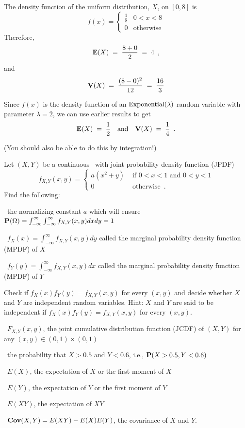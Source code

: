 \begin{ExerciseList}
\item The density function of the uniform distribution, $X$,  on $[0,8]$ is  $$f(x)=\begin{cases}\frac{1}{8}&0<x<8\\0&\textrm{otherwise}\end{cases}$$
Therefore, $$\mathbf{E}(X)\;=\;\frac{8+0}{2}\;=\;4\enspace,$$
and $$\mathbf{V}(X)\;=\;\frac{(8-0)^2}{12}\;=\;\frac{16}{3}$$

\item Since $f(x)$ is the density function of an $\mbox{{\rm Exponential}}(\lambda)$ random variable with parameter $\lambda=2$, we can use earlier results to get
$$\mathbf{E}(X)\;=\;\frac{1}{2}\quad \text{and}\quad
\mathbf{V}(X)\;=\;\frac{1}{4}\enspace.$$

(You should also be able to do this by integration!)
\ee

\Exercise
Let $(X,Y)$ be a continuous \rv~with joint probability density function (JPDF)
\[
f_{X,Y}(x,y)
=
\begin{cases}
a (x^2+y) & \text{ if } 0 < x < 1 \text{ and } 0 < y < 1\\
0 & \text{ otherwise} \enspace .
\end{cases}
\]
Find the following:
\be
\item~the normalizing constant $a$ which will ensure $\mathbf{P}(\Omega) = \int_{-\infty}^{\infty}\int_{-\infty}^{\infty} f_{X,Y}(x,y) dx dy = 1$
\item~$f_X(x) = \int_{-\infty}^{\infty} f_{X,Y}(x,y) dy$ called the marginal probability density function (MPDF) of $X$
\item~$f_Y(y) = \int_{-\infty}^{\infty} f_{X,Y}(x,y) dx$ called the marginal probability density function (MPDF) of $Y$
\item Check if $f_X(x)f_Y(y)=f_{X,Y}(x,y)$ for every $(x,y)$ and decide whether $X$ and $Y$ are independent random variables.  {Hint: $X$ and $Y$ are said to be independent if $f_X(x)f_Y(y)=f_{X,Y}(x,y)$ for every $(x,y)$.}
\item~$F_{X,Y}(x,y)$, the joint cumulative distribution function (JCDF) of $(X,Y)$ for any $(x,y) \in (0,1) \times (0,1)$ 
\item~the probability that $X > 0.5$ and $Y<0.6$, i.e., $\mathbf{P}(X>0.5,Y<0.6)$
\item~$E(X)$, the expectation of $X$ or the first moment of $X$
\item~$E(Y)$, the expectation of $Y$ or the first moment of $Y$
\item~$E(XY)$, the expectation of $XY$
\item~$\mathbf{Cov}(X,Y)=E(XY)-E(X)E(Y)$, the covariance of $X$ and $Y$.
\ee


\end{ExerciseList}
